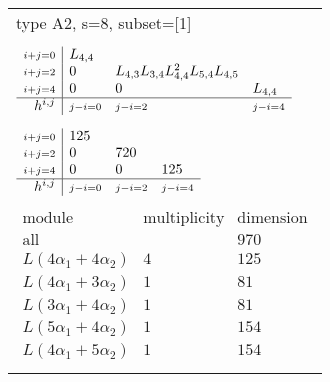 \documentclass[crop,border=2mm]{standalone}
\begin{document}
\begin{tabular}{l}
{\huge type A2, s=8, subset=[1]}\\ \\


$\displaystyle
\begin{array}{r|l l l}
	{\scriptstyle i+j=0}&L_{4,4}&&\\
	{\scriptstyle i+j=2}&0&L_{4,3}L_{3,4}L_{4,4}^{2}L_{5,4}L_{4,5}&\\
	{\scriptstyle i+j=4}&0&0&L_{4,4}\\
	\hline h^{i,j}&{\scriptstyle j-i=0}&{\scriptstyle j-i=2}&{\scriptstyle j-i=4}
\end{array}
$ \\ \\


$\displaystyle
\begin{array}{r|l l l}
	{\scriptstyle i+j=0}&125&&\\
	{\scriptstyle i+j=2}&0&720&\\
	{\scriptstyle i+j=4}&0&0&125\\
	\hline h^{i,j}&{\scriptstyle j-i=0}&{\scriptstyle j-i=2}&{\scriptstyle j-i=4}
\end{array}
$ \\ \\


$\displaystyle
\begin{array}{rll}
	\text{module}&\text{multiplicity}&\text{dimension} \\ \hline \text{all}&&970 \\
	L\left( 4\alpha_{1}+ 4\alpha_{2}\right)&4&125\\
	L\left( 4\alpha_{1}+ 3\alpha_{2}\right)&1&81\\
	L\left( 3\alpha_{1}+ 4\alpha_{2}\right)&1&81\\
	L\left( 5\alpha_{1}+ 4\alpha_{2}\right)&1&154\\
	L\left( 4\alpha_{1}+ 5\alpha_{2}\right)&1&154
\end{array}
$ \\ \\

\end{tabular}
\end{document}
